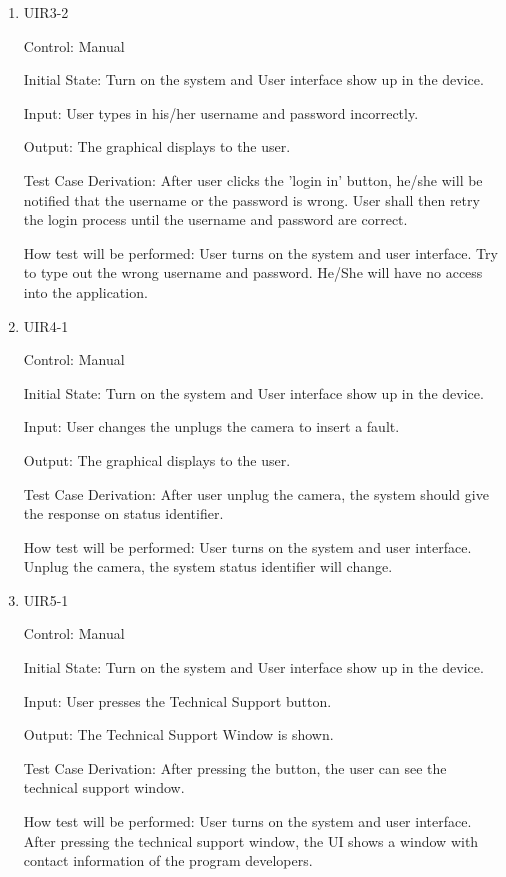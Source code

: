 \documentclass[12pt, titlepage]{article}
\begin{document}
\begin{enumerate}
\item{UIR3-2\\}

Control: Manual
					
Initial State: Turn on the system and User interface show up in the device.
					
Input: User types in his/her username and password incorrectly.
					
Output: The graphical displays to the user.

Test Case Derivation: After user clicks the 'login in' button, he/she will be notified that the username or the password is wrong. User shall then retry the login process until the username and password are correct.
					
How test will be performed: User turns on the system and user interface. Try to type out the wrong username and password. He/She will have no access into the application.
	
\item{UIR4-1\\}

Control: Manual
					
Initial State: Turn on the system and User interface show up in the device.
					
Input: User changes the unplugs the camera to insert a fault.
					
Output: The graphical displays to the user.

Test Case Derivation: After user unplug the camera, the system should give the response on status identifier.
					
How test will be performed: User turns on the system and user interface. Unplug the camera, the system status identifier will change.

\item{UIR5-1\\}

Control: Manual
					
Initial State: Turn on the system and User interface show up in the device.
					
Input: User presses the Technical Support button.
					
Output: The Technical Support Window is shown.

Test Case Derivation: After pressing the button, the user can see the technical support window.
					
How test will be performed: 
User turns on the system and user interface. After pressing the technical support window, the UI shows a window  with contact information of the program developers. 

\end{enumerate}
\end{document}
